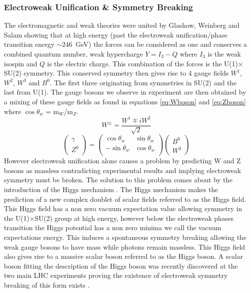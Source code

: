     \subsubsection*{Electroweak Unification \& Symmetry Breaking}
    The electromagnetic and weak theories were united by Glashow, Weinberg and Salam \cite{Glashow1961579,PhysRevLett.19.1264,Salam:1968rm} showing that at high energy (past the electroweak unification/phase transition energy $\sim246$~GeV) the forces can be considered as one and conserves a combined quantum number, weak hypercharge $Y = I_{3} - Q$ where $I_{3}$ is the weak isospin and $Q$ is the electric charge. This combination of the forces is the U(1)$\times$SU(2) symmetry. This conserved symmetry then gives rise to 4 gauge fields $W^{1}$, $W^{2}$, $W^{3}$ and $B^{0}$. The first three originating from symmetries in SU(2) and the last from U(1). The gauge bosons we observe in experiment are then obtained by a mixing of these gauge fields as found in equations \ref{eq:Wboson} and \ref{eq:Zboson} where $\cos{\theta_{w}}$ = m$_{W}$/m$_{Z}$.
    \begin{equation}
        W^{\pm} = \frac{W^{1} \mp iW^{2}}{\sqrt{2}}
      \label{eq:Wboson}
    \end{equation}
    \begin{equation}
        \left(\begin{array}{c} \gamma \\ Z^{0}\end{array}\right)
          = \left( \begin{array}{cc} 
              \cos\theta_{w} & \sin\theta_{w} \\  
              -\sin\theta_{w} & \cos\theta_{w} \\ 
            \end{array} \right)
            \left(\begin{array}{c} B^{0} \\ W^{3}\end{array}\right)
      \label{eq:Zboson}
    \end{equation}
    However electroweak unification alone causes a problem by predicting W and Z bosons as massless contradicting experimental results and implying electroweak symmetry must be broken. The solution to this problem comes about by the introduction of the Higgs mechanism \cite{PhysRevLett.13.321,PhysRevLett.13.508,PhysRevLett.13.585}. The Higgs mechanism makes the prediction of a new complex doublet of scalar fields referred to as the Higgs field. This Higgs field has a non zero vacuum expectation value allowing symmetry in the U(1)$\times$SU(2) group at high energy, however below the electroweak phases transition the Higgs potential has a non zero minima we call the vacuum expectations energy. This induces a spontaneous symmetry breaking allowing the weak gauge bosons to have mass while photons remain massless. This Higgs field also gives rise to a massive scalar boson referred to as the Higgs boson. A scalar boson fitting the description of the Higgs boson was recently discovered at the two main LHC experiments proving the existence of electroweak symmetry breaking of this form exists \cite{Aad20121,Chatrchyan201230}. 


